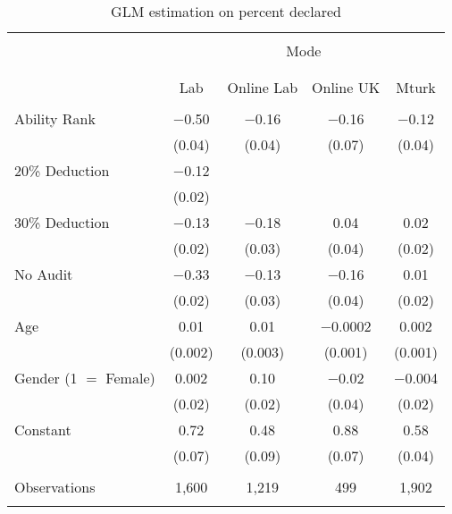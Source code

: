 
\begin{table}[!htbp] \centering 
  \caption{GLM estimation on percent declared} 
  \label{table:glm} 
\begin{tabular}{@{\extracolsep{5pt}}lcccc} 
\\[-1.8ex]\hline 
\hline \\[-1.8ex] 
 & \multicolumn{4}{c}{Mode} \\ 
\cline{2-5} 
\\[-1.8ex] & \multicolumn{4}{c}{} \\ 
 & Lab & Online Lab & Online UK & Mturk \\ 
\hline \\[-1.8ex] 
 Ability Rank & $-$0.50 & $-$0.16 & $-$0.16 & $-$0.12 \\ 
  & (0.04) & (0.04) & (0.07) & (0.04) \\ 
  20\% Deduction & $-$0.12 &  &  &  \\ 
  & (0.02) &  &  &  \\ 
  30\% Deduction & $-$0.13 & $-$0.18 & 0.04 & 0.02 \\ 
  & (0.02) & (0.03) & (0.04) & (0.02) \\ 
  No Audit & $-$0.33 & $-$0.13 & $-$0.16 & 0.01 \\ 
  & (0.02) & (0.03) & (0.04) & (0.02) \\ 
  Age & 0.01 & 0.01 & $-$0.0002 & 0.002 \\ 
  & (0.002) & (0.003) & (0.001) & (0.001) \\ 
  Gender (1 $=$ Female) & 0.002 & 0.10 & $-$0.02 & $-$0.004 \\ 
  & (0.02) & (0.02) & (0.04) & (0.02) \\ 
  Constant & 0.72 & 0.48 & 0.88 & 0.58 \\ 
  & (0.07) & (0.09) & (0.07) & (0.04) \\ 
 \hline \\[-1.8ex] 
Observations & 1,600 & 1,219 & 499 & 1,902 \\ 
\hline 
\hline \\[-1.8ex] 
\end{tabular} 
\end{table} 
